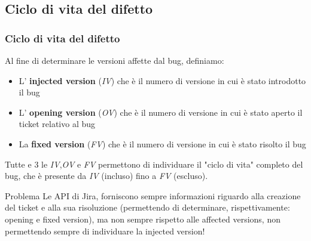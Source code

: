 \documentclass{beamer}
\begin{document}
\subsection{Ciclo di vita del difetto}
\begin{frame}
	\frametitle{Ciclo di vita del difetto}
	
	\fontsize{10pt}{10pt}\selectfont
	
	Al fine di determinare le versioni affette dal bug, definiamo:
	\begin{itemize}
		\item L' \textbf{injected version} (\textit{IV})
		che è il numero di versione in cui è stato introdotto il bug
		\item L' \textbf{opening version} (\textit{OV}) 
		che è il numero di versione in cui è stato aperto il ticket relativo al bug
		\item La \textbf{fixed version} (\textit{FV}) 
		che è il numero di versione in cui è stato risolto il bug
	\end{itemize}
	
	\begin{center}
	\end{center}
	
	Tutte e 3 le \textit{IV},\textit{OV} e \textit{FV} permettono di individuare il "ciclo di vita" completo del
	bug, che è presente da \textit{IV} (incluso) fino a \textit{FV} (escluso).
	\begin{alertblock}{Problema}
	Le API di Jira, forniscono sempre informazioni riguardo alla creazione del ticket e alla sua risoluzione
	(permettendo di determinare, rispettivamente: opening e fixed version), 
	ma non sempre rispetto alle affected versions, non permettendo sempre di individuare la injected version!
	\end{alertblock}
\end{frame}
\end{document}
